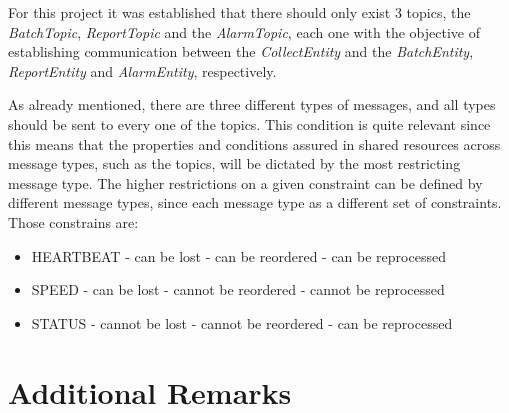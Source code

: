\documentclass[12pt]{article}
\begin{document}
For this project it was established that there should only exist 3 topics, the \textit{BatchTopic}, \textit{ReportTopic} and the \textit{AlarmTopic}, each one with the objective of establishing communication between the \textit{CollectEntity} and the \textit{BatchEntity}, \textit{ReportEntity} and \textit{AlarmEntity}, respectively.

As already mentioned, there are three different types of messages, and all types should be sent to every one of the topics. This condition is quite relevant since this means that the properties and conditions assured in shared resources across message types, such as the topics, will be dictated by the most restricting message type. The higher restrictions on a given constraint can be defined by different message types, since each message type as a different set of constraints. Those constrains are:

\begin{multicols}{3}
  \begin{itemize}
    \item HEARTBEAT
    \newline - can be lost
    \newline - can be reordered
    \newline - can be reprocessed
  \end{itemize}

  \columnbreak

  \begin{itemize}
    \item SPEED
    \newline - can be lost
    \newline - cannot be reordered
    \newline - cannot be reprocessed
  \end{itemize}

  \columnbreak

  \begin{itemize}
    \item STATUS
    \newline - cannot be lost
    \newline - cannot be reordered
    \newline - can be reprocessed
  \end{itemize}
\end{multicols}


\newpage
\section{Additional Remarks} %
\end{document}
